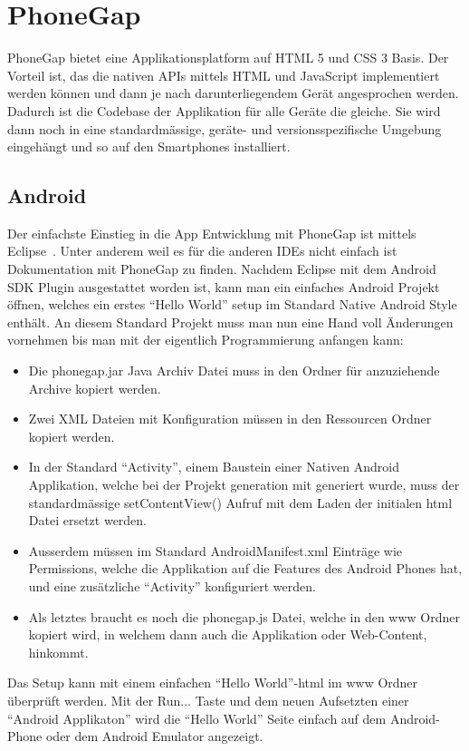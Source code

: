 
\newpage
\section{PhoneGap} %
\label{sec:PhoneGap}
PhoneGap bietet eine Applikationsplatform auf HTML 5 und CSS 3 Basis. Der Vorteil ist, das die nativen APIs mittels HTML und JavaScript implementiert werden können und dann je nach darunterliegendem Gerät angesprochen werden. Dadurch ist die Codebase der Applikation für alle Geräte die gleiche. Sie wird dann noch in eine standardmässige, geräte- und versionsspezifische Umgebung eingehängt und so auf den Smartphones installiert.

\subsection{Android} %
\label{sub:android}

Der einfachste Einstieg in die App Entwicklung mit PhoneGap ist mittels Eclipse~\cite{bib:eclipse}. Unter anderem weil es für die anderen IDEs nicht einfach ist Dokumentation mit PhoneGap zu finden. Nachdem Eclipse mit dem Android SDK Plugin ausgestattet worden ist, kann man ein einfaches Android Projekt öffnen, welches ein erstes "`Hello World"' setup im Standard Native Android Style enthält. 
An diesem Standard Projekt muss man nun eine Hand voll Änderungen vornehmen bis man mit der eigentlich Programmierung anfangen kann:
\begin{itemize}
    \item Die phonegap.jar Java Archiv Datei muss in den Ordner für anzuziehende Archive kopiert werden.
    \item Zwei XML Dateien mit Konfiguration müssen in den Ressourcen Ordner kopiert werden. 
    \item In der Standard "`Activity"', einem Baustein einer Nativen Android Applikation, welche bei der Projekt generation mit generiert wurde, muss der standardmässige setContentView() Aufruf mit dem Laden der initialen html Datei ersetzt werden.
    \item Ausserdem müssen im Standard AndroidManifest.xml Einträge wie Permissions, welche die Applikation auf die Features des Android Phones hat, und eine zusätzliche "`Activity"' konfiguriert werden.
    \item Als letztes braucht es noch die phonegap.js Datei, welche in den www Ordner kopiert wird, in welchem dann auch die Applikation oder Web-Content, hinkommt.
\end{itemize}
Das Setup kann mit einem einfachen "`Hello World"'-html im www Ordner überprüft werden. Mit der Run... Taste und dem neuen Aufsetzten einer "`Android Applikaton"' wird die "`Hello World"' Seite einfach auf dem Android-Phone oder dem Android Emulator angezeigt.


